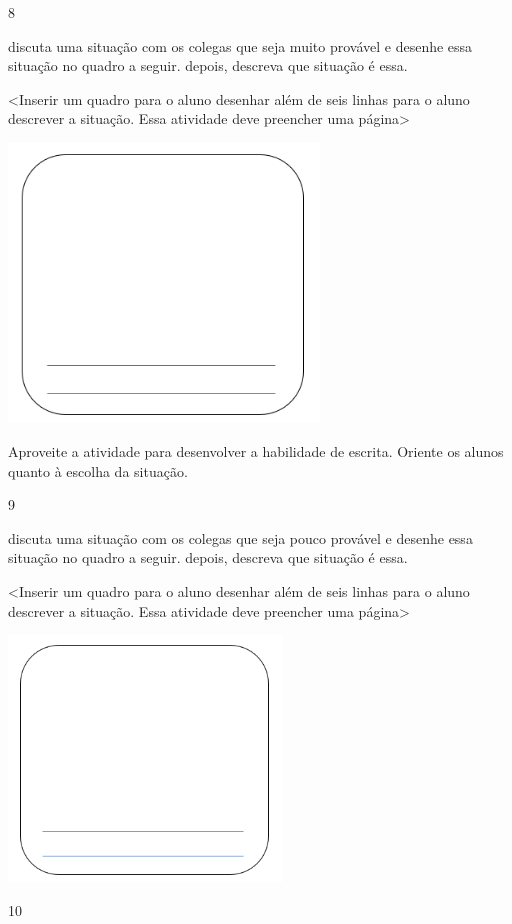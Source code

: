 \num{8}

discuta uma situação com os colegas que seja muito provável e desenhe
essa situação no quadro a seguir. depois, descreva que situação é essa.

\textless{}Inserir um quadro para o aluno desenhar além de seis linhas
para o aluno descrever a situação. Essa atividade deve preencher uma
página\textgreater{}

\includegraphics[width=3.24914in,height=2.92171in]{media/image92.png}

Aproveite a atividade para desenvolver a habilidade de
escrita. Oriente os alunos quanto à escolha da situação.

\num{9}

discuta uma situação com os colegas que seja pouco provável e desenhe
essa situação no quadro a seguir. depois, descreva que situação é essa.

\textless{}Inserir um quadro para o aluno desenhar além de seis linhas
para o aluno descrever a situação. Essa atividade deve preencher uma
página\textgreater{}

\includegraphics[width=2.86272in,height=2.57423in]{media/image92.png}


\num{10}

